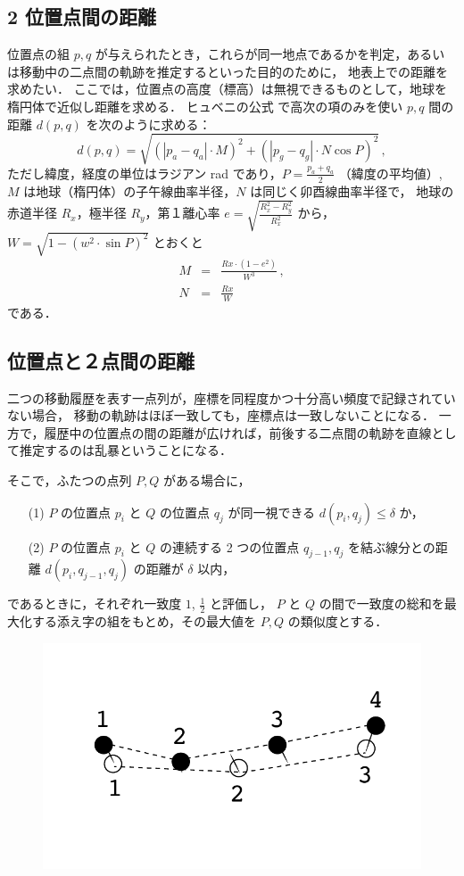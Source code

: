 \documentclass[11pt]{jarticle}
\begin{document}
\subsection{2 位置点間の距離}
位置点の組 $p, q$ が与えられたとき，これらが同一地点であるかを判定，あるいは移動中の二点間の軌跡を推定するといった目的のために，
地表上での距離を求めたい．
ここでは，位置点の高度（標高）は無視できるものとして，地球を楕円体で近似し距離を求める．
ヒュベニの公式 \cite{amano-tec,GSI,Hubeny-formula-ref1,Hubeny-formula-ref2} で高次の項のみを使い $p, q$ 間の距離 $d(p,q)$ を次のように求める：
\[
d(p,q) = \sqrt{(|p_a - q_a|\cdot M)^2 + \left(|p_g - q_g|\cdot N\cos{P} \right)^2} \,,
\]
ただし緯度，経度の単位はラジアン rad であり，$P = \frac{p_a+q_a}{2}$ （緯度の平均値）, $M$ は地球（楕円体）の子午線曲率半径，$N$ は同じく卯酉線曲率半径で，
地球の赤道半径 $R_x$，極半径 $R_y$，第１離心率 $e=\sqrt{\frac{R_x^2 - R_y^2}{R_x^2}}$ から，$W = \sqrt{1 - (w^2 \cdot \sin P)^2}$ とおくと
\begin{eqnarray*}
M &=& \frac{Rx\cdot (1 - e^2)}{W^3} \,, \\
N &=& \frac{Rx}{W}
\end{eqnarray*}
である．

\subsection{位置点と２点間の距離}

二つの移動履歴を表す一点列が，座標を同程度かつ十分高い頻度で記録されていない場合，
移動の軌跡はほぼ一致しても，座標点は一致しないことになる．
一方で，履歴中の位置点の間の距離が広ければ，前後する二点間の軌跡を直線として推定するのは乱暴ということになる．

そこで，ふたつの点列 $P, Q$ がある場合に，
\begin{itemize}
\item[(1)] $P$ の位置点 $p_i$ と $Q$ の位置点 $q_j$ が同一視できる $d(p_i, q_j) \leq \delta$ か，
\item[(2)] $P$ の位置点 $p_i$ と $Q$ の連続する 2 つの位置点 $q_{j-1}, q_j$ を結ぶ線分との距離 $d(p_i, q_{j-1}, q_j)$ の距離が $\delta$ 以内，
\end{itemize}
であるときに，それぞれ一致度 $1$, $\frac{1}{2}$ と評価し，
$P$ と $Q$ の間で一致度の総和を最大化する添え字の組をもとめ，その最大値を $P, Q$ の類似度とする．
\begin{figure}[h]
\centering
\includegraphics[scale=0.5]{matching.pdf}
\end{figure}
\end{document}
